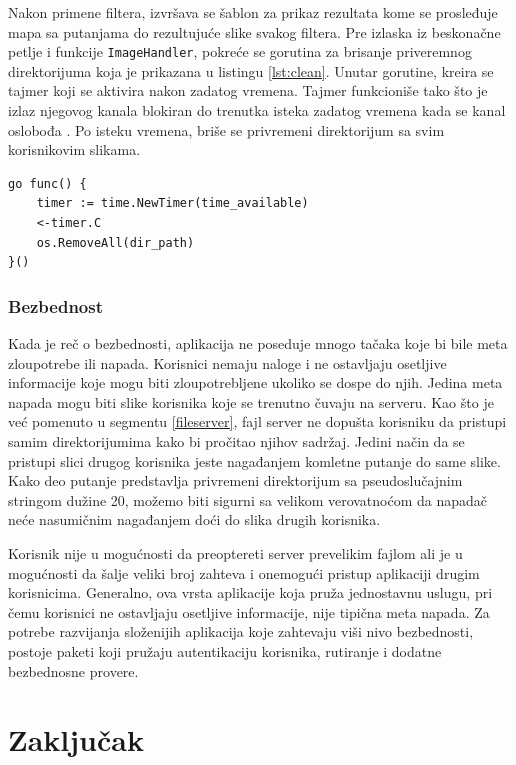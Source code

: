 \documentclass[12pt,oneside]{memoir}
\begin{document}
Nakon primene filtera, izvršava se šablon za prikaz rezultata kome se prosleđuje mapa sa putanjama do rezultujuće slike svakog filtera. Pre izlaska iz beskonačne petlje i funkcije  \texttt{ImageHandler}, pokreće se gorutina za brisanje priveremnog direktorijuma koja je prikazana u listingu \ref{lst:clean}. Unutar gorutine, kreira se tajmer koji se aktivira nakon zadatog vremena. Tajmer funkcioniše tako što je izlaz njegovog kanala blokiran do trenutka isteka zadatog vremena kada se kanal oslobođa \cite{time}. Po isteku vremena, briše se privremeni direktorijum sa svim korisnikovim slikama. 

\begin{center}
\begin{lstlisting}[caption=Gorutina za brisanje privremenih direktorijuma,label={lst:clean},  backgroundcolor=\color{background}]
go func() {
	timer := time.NewTimer(time_available)
	<-timer.C
	os.RemoveAll(dir_path)
}()
\end{lstlisting}
\end{center}


\subsection{Bezbednost}

Kada je reč o bezbednosti, aplikacija ne poseduje mnogo tačaka koje bi bile meta zloupotrebe ili napada. Korisnici nemaju naloge i ne ostavljaju osetljive informacije koje mogu biti zloupotrebljene ukoliko se dospe do njih. Jedina meta napada mogu biti slike korisnika koje se trenutno čuvaju na serveru. Kao što je već pomenuto u segmentu \ref{fileserver}, fajl server ne dopušta korisniku da pristupi samim direktorijumima kako bi pročitao njihov sadržaj. Jedini način da se pristupi slici drugog korisnika jeste nagađanjem komletne putanje do same slike. Kako deo putanje predstavlja privremeni direktorijum sa pseudoslučajnim stringom dužine 20, možemo biti sigurni sa velikom verovatnoćom da napadač neće nasumičnim nagađanjem doći do slika drugih korisnika. 

Korisnik nije u mogućnosti da preoptereti server prevelikim fajlom ali je u mogućnosti da šalje veliki broj zahteva i onemogući pristup aplikaciji drugim korisnicima. Generalno, ova vrsta aplikacije koja pruža jednostavnu uslugu, pri čemu korisnici ne ostavljaju osetljive informacije, nije tipična meta napada. Za potrebe razvijanja složenijih aplikacija koje zahtevaju viši nivo bezbednosti, postoje paketi koji pružaju autentikaciju korisnika, rutiranje i dodatne bezbednosne provere. 

\chapter{Zaključak}





\printbibliography 
\backmatter
\end{document}
